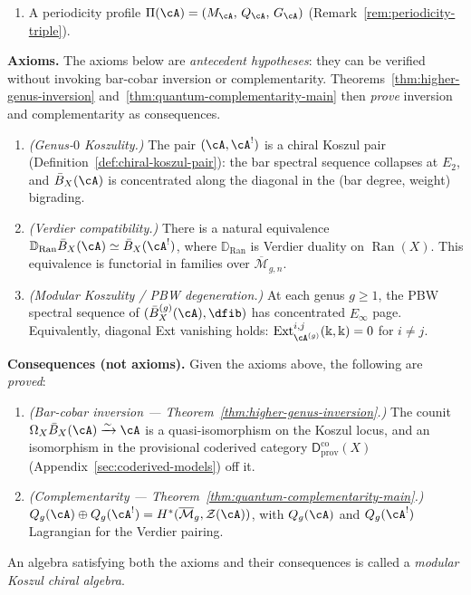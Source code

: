 \begin{definition}
\begin{enumerate}[label=\textup{(D\arabic*)}]
\item\label{D:periodicity-dg}
A periodicity profile
$\Pi(\cA) = (M_{\cA},\, Q_{\cA},\, G_{\cA})$
(Remark~\ref{rem:periodicity-triple}).
\end{enumerate}

\smallskip\noindent\textbf{Axioms.}
The axioms below are \emph{antecedent hypotheses}:
they can be verified without invoking bar-cobar inversion
or complementarity.  Theorems~\ref{thm:higher-genus-inversion}
and~\ref{thm:quantum-complementarity-main} then \emph{prove}
inversion and complementarity as consequences.
\begin{enumerate}[label=\textup{(MK\arabic*)}]
\item\label{MK:koszul}
\emph{(Genus-$0$ Koszulity.)}
The pair $(\cA, \cA^!)$ is a chiral Koszul pair
(Definition~\ref{def:chiral-koszul-pair}): the bar spectral
sequence collapses at $E_2$, and $\bar{B}_X(\cA)$ is concentrated
along the diagonal in the (bar degree, weight) bigrading.

\item\label{MK:verdier}
\emph{(Verdier compatibility.)}
There is a natural equivalence
$\mathbb{D}_{\operatorname{Ran}} \bar{B}_X(\cA) \simeq \bar{B}_X(\cA^!)$,
where $\mathbb{D}_{\operatorname{Ran}}$ is Verdier duality on
$\operatorname{Ran}(X)$.
This equivalence is functorial in families over
$\overline{\mathcal{M}}_{g,n}$.

\item\label{MK:modular}
\emph{(Modular Koszulity / PBW degeneration.)}
At each genus $g \geq 1$, the PBW spectral sequence of
$(\bar{B}^{(g)}_X(\cA), \dfib)$ has concentrated $E_\infty$ page.
Equivalently, diagonal Ext vanishing holds:
$\operatorname{Ext}^{i,j}_{\cA^{(g)}}(\Bbbk, \Bbbk) = 0$ for $i \neq j$.
\end{enumerate}

\smallskip\noindent\textbf{Consequences (not axioms).}
Given the axioms above, the following are \emph{proved}:
\begin{enumerate}[label=\textup{(MK\arabic*)},start=4]
\item\label{MK:inversion}
\emph{(Bar-cobar inversion --- Theorem~\textup{\ref{thm:higher-genus-inversion}}.)}
The counit $\Omega_X \bar{B}_X(\cA) \xrightarrow{\sim} \cA$ is a
quasi-isomorphism on the Koszul locus, and an isomorphism in the
provisional coderived category
$\mathsf{D}^{\mathrm{co}}_{\mathrm{prov}}(X)$
\textup{(}Appendix~\textup{\ref{sec:coderived-models})} off it.

\item\label{MK:complementarity}
\emph{(Complementarity --- Theorem~\textup{\ref{thm:quantum-complementarity-main}}.)}
$Q_g(\cA) \oplus Q_g(\cA^!) = H^*(\overline{\mathcal{M}}_g, \mathcal{Z}(\cA))$,
with $Q_g(\cA)$ and $Q_g(\cA^!)$ Lagrangian for the Verdier pairing.
\end{enumerate}

An algebra satisfying both the axioms and their consequences is called a
\emph{modular Koszul chiral algebra}.
\end{definition}

